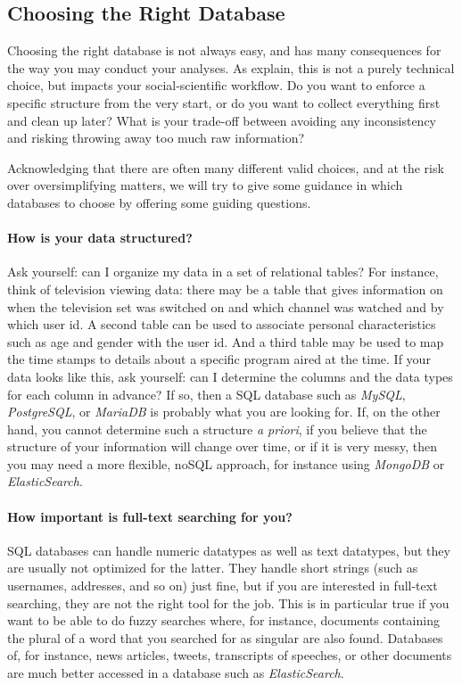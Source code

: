 \subsection{Choosing the Right Database}
Choosing the right database is not always easy, and has many consequences
for the way you may conduct your analyses. As \citet{Gunther2018} explain,
this is not a purely technical choice, but impacts your social-scientific
workflow. Do you want to enforce a specific structure from the very
start, or do you  want to collect everything first and clean up
later? What is your trade-off between avoiding any inconsistency and risking
 throwing away too much raw information?

Acknowledging that there are often many different valid choices, and at
the risk over oversimplifying matters, we will try to give some guidance
in which databases to choose by offering some guiding questions.


\paragraph[How is your data structured?]{How is your data structured?}
Ask yourself: can I organize my data
in a set of relational tables? For instance, think of television
viewing data: there may be a table that gives information on when the
television set was switched on and which channel was watched and by
which user id. A second table can be used to associate personal
characteristics such as age and gender with the user id. And a third
table may be used to map the time stamps to details about a specific
program aired at the time.  If your data looks like this, ask
yourself: can I determine the columns and the data types for each
column in advance?  If so, then a SQL database such as \emph{MySQL},
\emph{PostgreSQL}, or \emph{MariaDB} is probably what you are looking
for. If, on the other hand, you cannot determine such a structure \emph{a
priori}, if you believe that the structure of your information will
change over time, or if it is very messy, then you may need a more
flexible, noSQL approach, for instance using \emph{MongoDB} or
\emph{ElasticSearch}.

\paragraph[How important is full-text searching for you?]{How important is full-text searching for you?}
SQL databases can handle numeric datatypes as well as text datatypes, but they are usually not optimized for the latter. They handle short strings (such as usernames, addresses, and so on) just fine, but if you are interested in full-text searching, they are not the right tool for the job. This is in particular true if you want to be able to do fuzzy searches where, for instance,  documents containing the plural of a word that you searched for as singular are also found. Databases of, for instance, news articles, tweets, transcripts of speeches, or other documents are much better accessed in a database such as \emph{ElasticSearch}.


